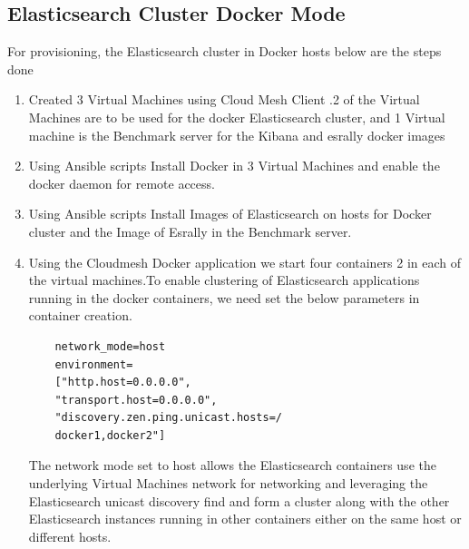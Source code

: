 \documentclass[9pt,twocolumn,twoside]{../../styles/osajnl}
\begin{document}
 \subsection{Elasticsearch Cluster Docker Mode}
  For provisioning, the Elasticsearch cluster in Docker hosts below are the steps done
\begin{enumerate}
\item Created 3 Virtual Machines using Cloud Mesh Client .2 of the Virtual Machines  are to be used for the docker Elasticsearch cluster, and 1 Virtual machine is the Benchmark server for the Kibana and esrally docker images 
\item Using Ansible scripts Install Docker in 3 Virtual Machines and enable the docker daemon for remote access.
\item Using Ansible scripts Install Images of Elasticsearch on hosts for Docker cluster and the Image of Esrally in the Benchmark server.
\item Using the Cloudmesh Docker application we start four containers 2 in each of the virtual machines.To enable clustering of Elasticsearch applications running in the docker containers, we need set the below parameters in container creation.
\begin{verbatim}
    network_mode=host 
    environment=
    ["http.host=0.0.0.0",
    "transport.host=0.0.0.0",
    "discovery.zen.ping.unicast.hosts=/
    docker1,docker2"]
\end{verbatim}
The network mode set to host allows the Elasticsearch containers use the underlying Virtual Machines  network for networking and leveraging the Elasticsearch unicast discovery find and form a cluster along with the other Elasticsearch instances running in other
containers either on the same host or different hosts.

\end{enumerate}
\end{document}
